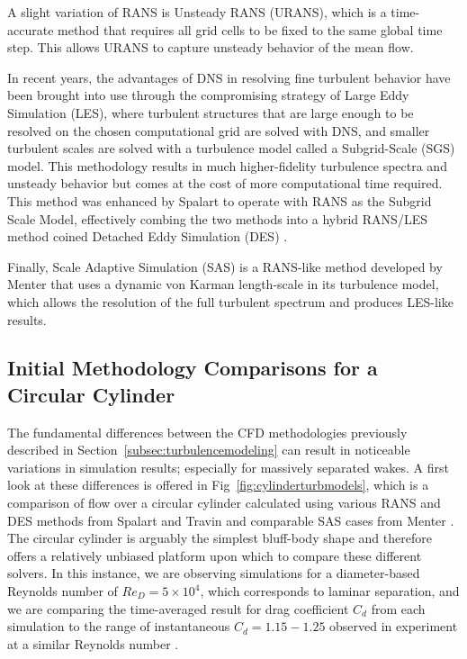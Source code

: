 \documentclass[journal]{new-aiaa}
\begin{document}
A slight variation of RANS is Unsteady RANS (URANS), which is a time-accurate method that requires all grid cells to be fixed to the same global time step.  This allows URANS to capture unsteady behavior of the mean flow.

In recent years, the advantages of DNS in resolving fine turbulent behavior have been brought into use through the compromising strategy of Large Eddy Simulation (LES), where turbulent structures that are large enough to be resolved on the chosen computational grid are solved with DNS, and smaller turbulent scales are solved with a turbulence model called a Subgrid-Scale (SGS) model. This methodology results in much higher-fidelity turbulence spectra and unsteady behavior but comes at the cost of more computational time required. This method was enhanced by Spalart to operate with RANS as the Subgrid Scale Model, effectively combing the two methods into a hybrid RANS/LES method coined Detached Eddy Simulation (DES) \cite{spalart2009detachededdy}.

Finally, Scale Adaptive Simulation (SAS) is a RANS-like method developed by Menter \cite{menter2005scaleadaptive} that uses a dynamic von Karman length-scale in its turbulence model, which allows the resolution of the full turbulent spectrum and produces LES-like results.











\subsection{Initial Methodology Comparisons for a Circular Cylinder} \label{subsec:initialcompare}

The fundamental differences between the CFD methodologies previously described in Section~\ref{subsec:turbulencemodeling} can result in noticeable variations in simulation results; especially for massively separated wakes. A first look at these differences is offered in Fig~\ref{fig:cylinderturbmodels}, which is a comparison of flow over a circular cylinder calculated using various RANS and DES methods from Spalart and Travin \cite{spalart2009detachededdy} and comparable SAS cases from Menter \cite{menter2005scaleadaptive}. The circular cylinder is arguably the simplest bluff-body shape and therefore offers a relatively unbiased platform upon which to compare these different solvers. In this instance, we are observing simulations for a diameter-based Reynolds number of $Re_D = 5 \times 10^4$, which corresponds to laminar separation, and we are comparing the time-averaged result for drag coefficient $C_d$ from each simulation to the range of instantaneous $C_d=1.15-1.25$ observed in experiment at a similar Reynolds number \cite{travin2000detachededdy}.
\end{document}
